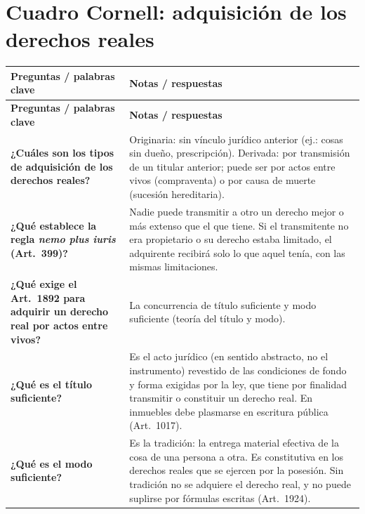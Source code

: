 \documentclass[12pt,oneside]{book}
\begin{document}
\section{Cuadro Cornell: adquisición de los derechos reales}

\begin{longtable}{>{\raggedright\arraybackslash}p{}>{\raggedright\arraybackslash}p{}}
\toprule
\textbf{Preguntas / palabras clave} & \textbf{Notas / respuestas} \\
\midrule
\endfirsthead
\toprule
\textbf{Preguntas / palabras clave} & \textbf{Notas / respuestas} \\
\midrule
\endhead
\bottomrule
\endfoot
\textbf{¿Cuáles son los tipos de adquisición de los derechos reales?} &
Originaria: sin vínculo jurídico anterior (ej.: cosas sin dueño, prescripción). Derivada: por transmisión de un titular anterior; puede ser por actos entre vivos (compraventa) o por causa de muerte (sucesión hereditaria). \\[0.8em]

\textbf{¿Qué establece la regla \textit{nemo plus iuris} (Art.~399)?} &
Nadie puede transmitir a otro un derecho mejor o más extenso que el que tiene. Si el transmitente no era propietario o su derecho estaba limitado, el adquirente recibirá solo lo que aquel tenía, con las mismas limitaciones. \\[0.8em]

\textbf{¿Qué exige el Art.~1892 para adquirir un derecho real por actos entre vivos?} &
La concurrencia de título suficiente y modo suficiente (teoría del título y modo). \\[0.8em]

\textbf{¿Qué es el título suficiente?} &
Es el acto jurídico (en sentido abstracto, no el instrumento) revestido de las condiciones de fondo y forma exigidas por la ley, que tiene por finalidad transmitir o constituir un derecho real. En inmuebles debe plasmarse en escritura pública (Art.~1017). \\[0.8em]

\textbf{¿Qué es el modo suficiente?} &
Es la tradición: la entrega material efectiva de la cosa de una persona a otra. Es constitutiva en los derechos reales que se ejercen por la posesión. Sin tradición no se adquiere el derecho real, y no puede suplirse por fórmulas escritas (Art.~1924). \\[0.8em]


\end{longtable}
\end{document}
